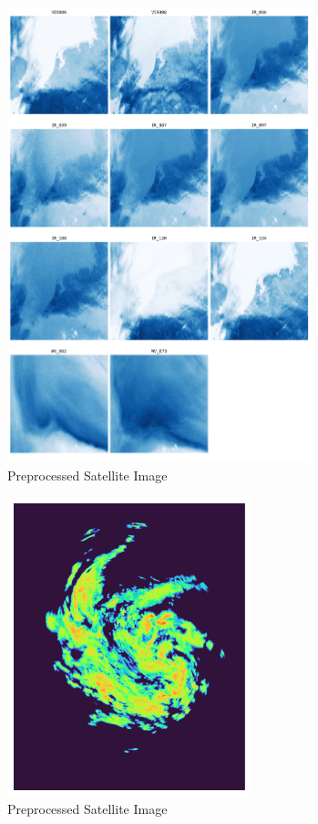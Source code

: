 \documentclass[acmtog, screen, balance]{acmart}
\begin{document}
\begin{figure}[hbp]
  \centering
  \includegraphics[width=250pt]{./images/single_satellite.png}
  \caption{Preprocessed Satellite Image}
  \Description{}
  \label{fig:satchannels}
\end{figure}

\begin{figure}[hbp]
  \centering
  \includegraphics[width=200pt]{./images/radar_image.png}
  \caption{Preprocessed Satellite Image}
  \Description{}
  \label{fig:radar-pre}
\end{figure}
\end{document}

